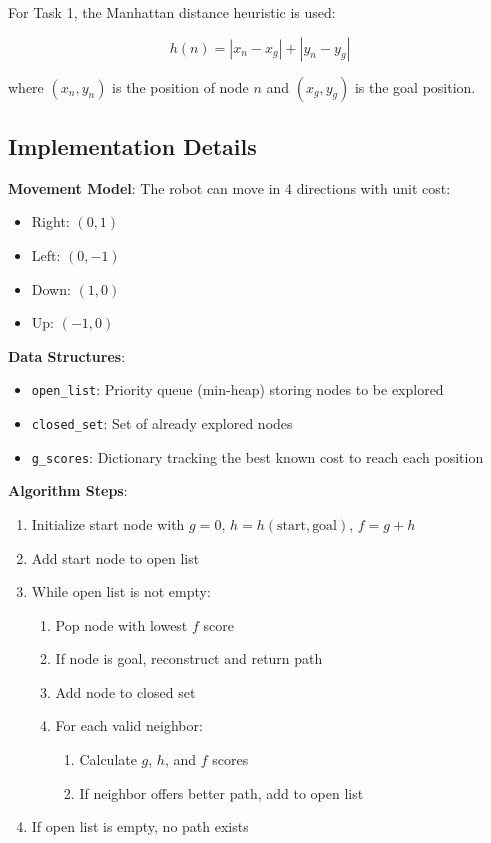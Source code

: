 \documentclass[aps,letterpaper,10pt]{revtex4}
\begin{document}
For Task 1, the Manhattan distance heuristic is used:

\begin{equation}
h(n) = |x_n - x_g| + |y_n - y_g|
\end{equation}

where $(x_n, y_n)$ is the position of node $n$ and $(x_g, y_g)$ is the goal position.

\subsection{Implementation Details}

\textbf{Movement Model}: The robot can move in 4 directions with unit cost:
\begin{itemize}
    \item Right: $(0, 1)$
    \item Left: $(0, -1)$
    \item Down: $(1, 0)$
    \item Up: $(-1, 0)$
\end{itemize}

\textbf{Data Structures}:
\begin{itemize}
    \item \texttt{open\_list}: Priority queue (min-heap) storing nodes to be explored
    \item \texttt{closed\_set}: Set of already explored nodes
    \item \texttt{g\_scores}: Dictionary tracking the best known cost to reach each position
\end{itemize}

\textbf{Algorithm Steps}:
\begin{enumerate}
    \item Initialize start node with $g=0$, $h=h(\text{start}, \text{goal})$, $f=g+h$
    \item Add start node to open list
    \item While open list is not empty:
    \begin{enumerate}
        \item Pop node with lowest $f$ score
        \item If node is goal, reconstruct and return path
        \item Add node to closed set
        \item For each valid neighbor:
        \begin{enumerate}
            \item Calculate $g$, $h$, and $f$ scores
            \item If neighbor offers better path, add to open list
        \end{enumerate}
    \end{enumerate}
    \item If open list is empty, no path exists
\end{enumerate}
\end{document}
